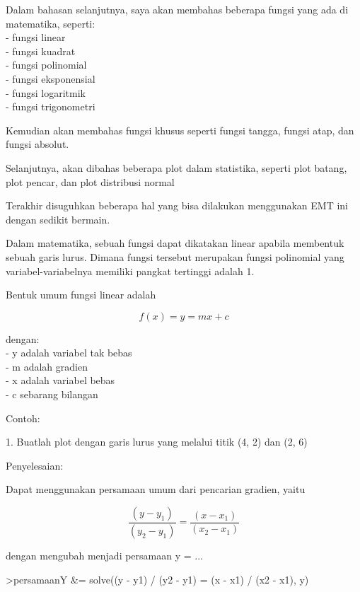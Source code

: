 \documentclass[a4paper,10pt]{article}
\begin{document}
\begin{eulernotebook}
\begin{eulercomment}
\begin{eulercomment}
\begin{eulercomment}
\begin{eulercomment}
\begin{eulercomment}
Dalam bahasan selanjutnya, saya akan membahas beberapa fungsi yang ada
di matematika, seperti:\\
- fungsi linear\\
- fungsi kuadrat\\
- fungsi polinomial\\
- fungsi eksponensial\\
- fungsi logaritmik\\
- fungsi trigonometri

Kemudian akan membahas fungsi khusus seperti fungsi tangga, fungsi
atap, dan fungsi absolut.

Selanjutnya, akan dibahas beberapa plot dalam statistika, seperti plot
batang, plot pencar, dan plot distribusi normal

Terakhir disuguhkan beberapa hal yang bisa dilakukan menggunakan EMT
ini dengan sedikit bermain.
\end{eulercomment}
\begin{eulercomment}
Dalam matematika, sebuah fungsi dapat dikatakan linear apabila
membentuk sebuah garis lurus. Dimana fungsi tersebut merupakan fungsi
polinomial yang variabel-variabelnya memiliki pangkat tertinggi adalah
1.

Bentuk umum fungsi linear adalah

\end{eulercomment}
\begin{eulerformula}
\[
f(x) = y = mx + c
\]
\end{eulerformula}
\begin{eulercomment}
dengan:\\
- y adalah variabel tak bebas\\
- m adalah gradien\\
- x adalah variabel bebas\\
- c sebarang bilangan

Contoh:

1. Buatlah plot dengan garis lurus yang melalui titik (4, 2) dan (2,
6)

Penyelesaian:

Dapat menggunakan persamaan umum dari pencarian gradien, yaitu

\end{eulercomment}
\begin{eulerformula}
\[
\frac{(y - y_1)}{(y_2 - y_1)} = \frac{(x - x_1)}{(x_2 - x_1)}
\]
\end{eulerformula}
\begin{eulercomment}
dengan mengubah menjadi persamaan y = ...
\end{eulercomment}
\begin{eulerprompt}
>persamaanY &= solve((y - y1) / (y2 - y1) = (x - x1) / (x2 - x1), y)
\end{eulerprompt}
\begin{euleroutput}
  

\end{euleroutput}
\end{eulercomment}
\end{eulercomment}
\end{eulercomment}
\end{eulercomment}
\end{eulernotebook}
\end{document}
